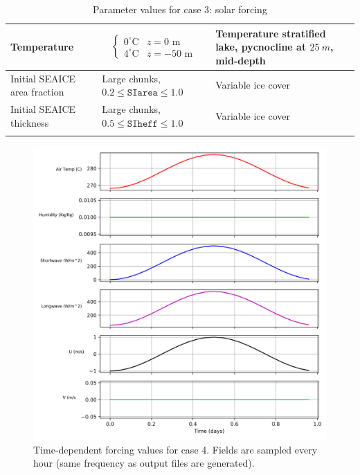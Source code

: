 \documentclass[11pt]{article}
\begin{document}
\begin{longtable}{  p{}  p{}  p{}  }
Temperature & \begin{equation*} \begin{cases} 0^{\circ} \text{C} & z = 0 \text{ m} \\ 4 ^{\circ} \text{C} & z = -50 \text{ m}   \end{cases} \end{equation*} & Temperature stratified lake, pycnocline at $\SI{25}{m}$, mid-depth \\ \hline
Initial SEAICE area fraction   & Large chunks, $0.2 \leq \texttt{SIarea} \leq 1.0$ & Variable ice cover \\ \hline
Initial SEAICE thickness    & Large chunks, $0.5 \leq \texttt{SIheff} \leq 1.0$ & Variable ice cover \\ \hline

\caption{Parameter values for case 3: solar forcing}
\label{table:periodicForcing}
\end{longtable}

\begin{figure}[h!]
\includegraphics[width=\linewidth]{periodicForcing/forcing}
\caption{Time-dependent forcing values for case 4. Fields are sampled every hour (same frequency as output files are generated).}
\label{fig:periodicForcingFields}
\end{figure}
\end{document}
